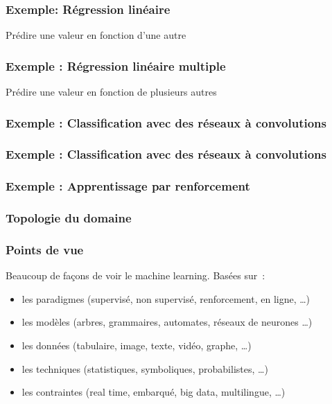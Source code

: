 \begin{frame}
  \frametitle{Exemple: Régression linéaire}
  Prédire une valeur en fonction d'une autre

\end{frame}

\begin{frame}
  \frametitle{Exemple : Régression linéaire multiple}
  Prédire une valeur en fonction de plusieurs autres

\end{frame}

\begin{frame}
  \frametitle{Exemple : Classification avec des réseaux à convolutions}
  
\end{frame}

\begin{frame}
  \frametitle{Exemple : Classification avec des réseaux à convolutions}
\end{frame}

\begin{frame}
  \frametitle{Exemple : Apprentissage par renforcement}
\end{frame}

\begin{frame}
  \frametitle{Topologie du domaine}
\end{frame}

\begin{frame}
  \frametitle{Points de vue}
  Beaucoup de façons de voir le machine learning. Basées sur :
  \begin{itemize}[<+->]
  \item les paradigmes (supervisé, non supervisé, renforcement, en
    ligne, …)
  \item les modèles (arbres, grammaires, automates, réseaux de
    neurones …)
  \item les données (tabulaire, image, texte, vidéo, graphe, …)
  \item les techniques (statistiques, symboliques, probabilistes, …)
  \item les contraintes (real time, embarqué, big data, multilingue,
    …)
  \end{itemize}

\end{frame}

